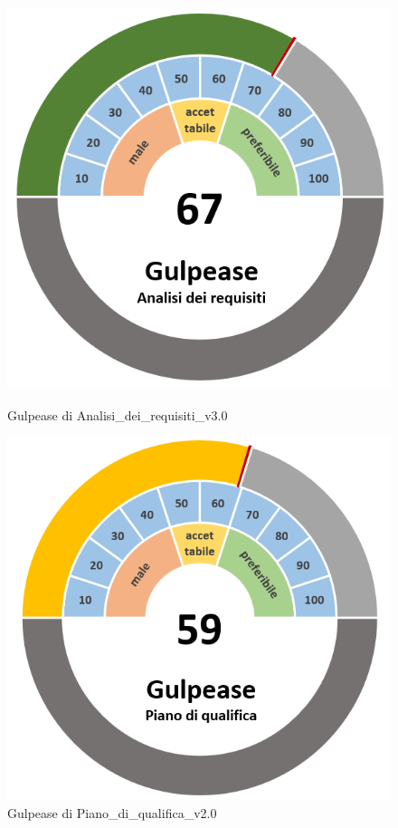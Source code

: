 \begin{figure}[H]
    \centering
    \begin{minipage}[b]{0.45\textwidth}
        \centering
        \includegraphics[width=\textwidth]{GulpeaseAdr.png}
        \caption{Gulpease di Analisi\_dei\_requisiti\_v3.0}
    \end{minipage}
    \hfill
    \begin{minipage}[b]{0.45\textwidth}
        \centering
        \includegraphics[width=\textwidth]{GulpeasePdq.png}
        \caption{Gulpease di Piano\_di\_qualifica\_v2.0}
    \end{minipage}
\end{figure} %
